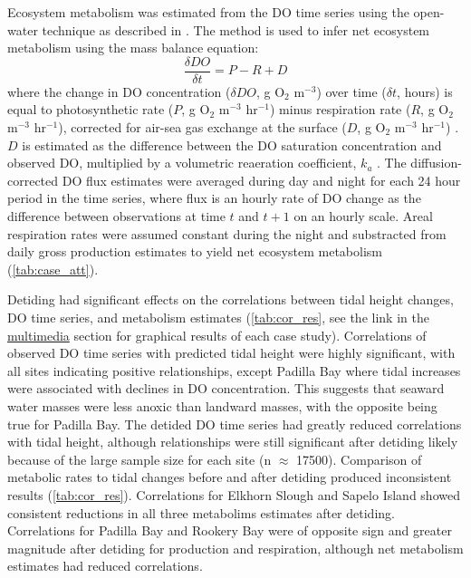 \documentclass[letterpaper,12pt,oneside]{article}\usepackage[]{graphicx}\usepackage[]{color}
\begin{document}
Ecosystem metabolism was estimated from the \ac{DO} time series using the open-water technique \citep{Odum56} as described in \citet{Caffrey13}.  The method is used to infer net ecosystem metabolism using the mass balance equation:
\begin{equation} \label{metrate}
\frac{\delta DO}{\delta t} = P - R + D
\end{equation}
where the change in \ac{DO} concentration ($\delta DO$, g O$_2$ m$^{-3}$) over time ($\delta t$, hours) is equal to photosynthetic rate ($P$, g O$_2$ m$^{-3}$ hr$^{-1}$) minus respiration rate ($R$, g O$_2$ m$^{-3}$ hr$^{-1}$), corrected for air-sea gas exchange at the surface ($D$, g O$_2$ m$^{-3}$ hr$^{-1}$) \citep{Caffrey13}. $D$ is estimated as the difference between the \ac{DO} saturation concentration and observed \ac{DO}, multiplied by a volumetric reaeration coefficient, $k_a$ \citep{Thebault08}.  The diffusion-corrected \ac{DO} flux estimates were averaged during day and night for each 24 hour period in the time series, where flux is an hourly rate of \ac{DO} change as the difference between observations at time $t$ and $t+1$ on an hourly scale.  Areal respiration rates were assumed constant during the night and substracted from daily gross production estimates to yield net ecosystem metabolism (\cref{tab:case_att}).  

Detiding had significant effects on the correlations between tidal height changes, \ac{DO} time series, and metabolism estimates (\cref{tab:cor_res},  see the link in the \hyperref[multi]{multimedia} section for graphical results of each case study).  Correlations of observed \ac{DO} time series with predicted tidal height were highly significant, with all sites indicating positive relationships, except Padilla Bay where tidal increases were associated with declines in \ac{DO}  concentration.  This suggests that seaward water masses were less anoxic than landward masses, with the opposite being true for Padilla Bay. The detided \ac{DO} time series had greatly reduced correlations with tidal height, although relationships were still significant after detiding likely because of the large sample size for each site (n $\approx$ 17500). Comparison of metabolic rates to tidal changes before and after detiding produced inconsistent results (\cref{tab:cor_res}).  Correlations for Elkhorn Slough and Sapelo Island showed consistent reductions in all three metabolims estimates after detiding.  Correlations for Padilla Bay and Rookery Bay were of opposite sign and greater magnitude after detiding for production and respiration, although net metabolism estimates had reduced correlations.  
\end{document}
